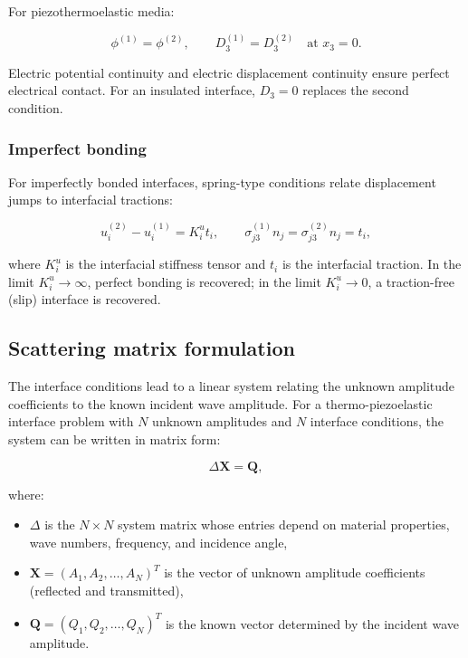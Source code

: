 For piezothermoelastic media:

\begin{equation}
\phi^{(1)} = \phi^{(2)}, \qquad D_3^{(1)} = D_3^{(2)} \quad \text{at } x_3 = 0.
\label{eq:9.5}
\end{equation}

Electric potential continuity and electric displacement continuity ensure perfect electrical contact. For an insulated interface, $D_3 = 0$ replaces the second condition.

\subsubsection{Imperfect bonding}

For imperfectly bonded interfaces, spring-type conditions relate displacement jumps to interfacial tractions:

\begin{equation}
u_i^{(2)} - u_i^{(1)} = K_i^u t_i, \qquad \sigma_{j3}^{(1)}n_j = \sigma_{j3}^{(2)}n_j = t_i,
\label{eq:9.6}
\end{equation}

where $K_i^u$ is the interfacial stiffness tensor and $t_i$ is the interfacial traction. In the limit $K_i^u \to \infty$, perfect bonding is recovered; in the limit $K_i^u \to 0$, a traction-free (slip) interface is recovered.

\subsection{Scattering matrix formulation}
\label{sec:9.4}

The interface conditions lead to a linear system relating the unknown amplitude coefficients to the known incident wave amplitude. For a thermo-piezoelastic interface problem with $N$ unknown amplitudes and $N$ interface conditions, the system can be written in matrix form:

\begin{equation}
\Delta \bm{X} = \bm{Q},
\label{eq:9.7}
\end{equation}

where:
\begin{itemize}
\item $\Delta$ is the $N\times N$ system matrix whose entries depend on material properties, wave numbers, frequency, and incidence angle,
\item $\bm{X} = (A_1, A_2, \ldots, A_N)^T$ is the vector of unknown amplitude coefficients (reflected and transmitted),
\item $\bm{Q} = (Q_1, Q_2, \ldots, Q_N)^T$ is the known vector determined by the incident wave amplitude.
\end{itemize}

